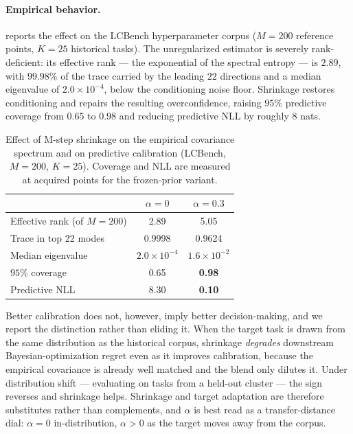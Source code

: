 \paragraph{Empirical behavior.}
 reports the effect on the LCBench hyperparameter
corpus ($M=200$ reference points, $K=25$ historical tasks). The unregularized
estimator is severely rank-deficient: its effective rank --- the exponential of
the spectral entropy --- is $2.89$, with $99.98\%$ of the trace carried by the
leading $22$ directions and a median eigenvalue of $2.0\times10^{-4}$, below the
conditioning noise floor. Shrinkage restores conditioning and repairs the
resulting overconfidence, raising $95\%$ predictive coverage from $0.65$ to
$0.98$ and reducing predictive NLL by roughly $8$ nats.

\begin{table}[ht]
\small
\centering
\caption{Effect of M-step shrinkage on the empirical covariance spectrum and on
predictive calibration (LCBench, $M=200$, $K=25$). Coverage and NLL are measured
at acquired points for the frozen-prior variant.}
\label{tab:shrinkage_spectrum}
\setlength{\tabcolsep}{5pt}
\begin{tabular}{lcc}
\toprule
 & $\alpha = 0$ & $\alpha = 0.3$ \\
\midrule
Effective rank (of $M=200$)      & 2.89                 & 5.05 \\
Trace in top 22 modes            & 0.9998               & 0.9624 \\
Median eigenvalue                & $2.0\times10^{-4}$   & $1.6\times10^{-2}$ \\
\midrule
$95\%$ coverage                  & 0.65                 & \textbf{0.98} \\
Predictive NLL                   & 8.30                 & \textbf{0.10} \\
\bottomrule
\end{tabular}
\end{table}

Better calibration does not, however, imply better decision-making, and we
report the distinction rather than eliding it. When the target task is drawn from
the same distribution as the historical corpus, shrinkage \emph{degrades}
downstream Bayesian-optimization regret even as it improves calibration, because
the empirical covariance is already well matched and the blend only dilutes it.
Under distribution shift --- evaluating on tasks from a held-out cluster --- the
sign reverses and shrinkage helps. Shrinkage and target adaptation are therefore
substitutes rather than complements, and $\alpha$ is best read as a
transfer-distance dial: $\alpha=0$ in-distribution, $\alpha>0$ as the target moves
away from the corpus.

